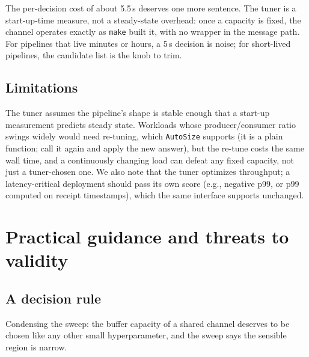 \documentclass[10pt,a4paper]{article}
\begin{document}
The per-decision cost of about 5.5\,s deserves one more sentence.
The tuner is a start-up-time measure, not a steady-state overhead: once a
capacity is fixed, the channel operates exactly as \texttt{make} built it, with
no wrapper in the message path. For pipelines that live minutes or hours, a
5\,s decision is noise; for short-lived pipelines, the candidate list is the
knob to trim.

\subsection{Limitations}
\label{sec:tuner-limits}

The tuner assumes the pipeline's shape is stable enough that a start-up
measurement predicts steady state. Workloads whose producer/consumer ratio
swings widely would need re-tuning, which \texttt{AutoSize} supports (it is a
plain function; call it again and apply the new answer), but the re-tune costs
the same wall time, and a continuously changing load can defeat any fixed
capacity, not just a tuner-chosen one. We also note that the tuner optimizes
throughput; a latency-critical deployment should pass its own score (e.g.,
negative p99, or p99 computed on receipt timestamps), which the same interface
supports unchanged.

\section{Practical guidance and threats to validity}
\label{sec:guidance}

\subsection{A decision rule}
\label{sec:guidance-rule}

Condensing the sweep: the buffer capacity of a shared channel deserves to be
chosen like any other small hyperparameter, and the sweep says the sensible
region is narrow.
\end{document}
